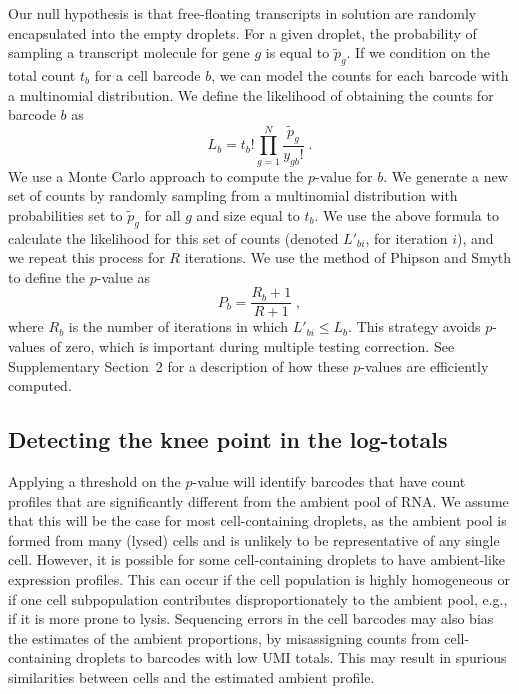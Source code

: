 \documentclass[10pt,letterpaper]{article}
\newcommand{\suppsecmontecarlo}{2}
\begin{document}
Our null hypothesis is that free-floating transcripts in solution are randomly encapsulated into the empty droplets.
For a given droplet, the probability of sampling a transcript molecule for gene $g$ is equal to $\tilde{p}_g$.
If we condition on the total count $t_b$ for a cell barcode $b$, we can model the counts for each barcode with a multinomial distribution.
We define the likelihood of obtaining the counts for barcode $b$ as 
\[
    L_b = t_b! \prod_{g=1}^N \frac{\tilde{p}_g}{y_{gb}!} \;.
\]
We use a Monte Carlo approach to compute the $p$-value for $b$.
We generate a new set of counts by randomly sampling from a multinomial distribution with probabilities set to $\tilde{p}_g$ for all $g$ and size equal to $t_b$.
We use the above formula to calculate the likelihood for this set of counts (denoted $L'_{bi}$, for iteration $i$), and we repeat this process for $R$ iterations. 
We use the method of Phipson and Smyth \cite{phipson2010permutation} to define the $p$-value as 
\[
    P_b = \frac{R_b +1 }{R + 1} \;,
\]
where $R_b$ is the number of iterations in which $L'_{bi} \le L_b$.
This strategy avoids $p$-values of zero, which is important during multiple testing correction.
See Supplementary Section~\suppsecmontecarlo{} for a description of how these $p$-values are efficiently computed.

\subsection*{Detecting the knee point in the log-totals}
Applying a threshold on the $p$-value will identify barcodes that have count profiles that are significantly different from the ambient pool of RNA.
We assume that this will be the case for most cell-containing droplets, as the ambient pool is formed from many (lysed) cells and is unlikely to be representative of any single cell.
However, it is possible for some cell-containing droplets to have ambient-like expression profiles.
This can occur if the cell population is highly homogeneous or if one cell subpopulation contributes disproportionately to the ambient pool, e.g., if it is more prone to lysis.
Sequencing errors in the cell barcodes may also bias the estimates of the ambient proportions, by misassigning counts from cell-containing droplets to barcodes with low UMI totals.
This may result in spurious similarities between cells and the estimated ambient profile.
\end{document}
